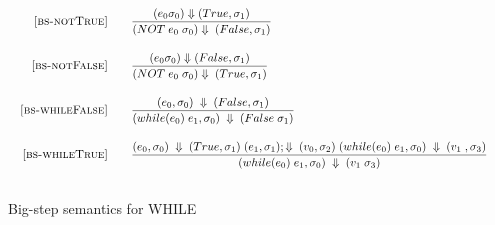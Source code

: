 \documentclass{article}
\begin{document}
\newpage
\begin{figure}[H]\label{fig:bigstep}
\caption{Big-step semantics for WHILE}

\[
\begin{array}{cc}
\begin{array}{r@{\qquad}l}
\bsrule{bs-notTrue}{
  ({e_0}{\sigma_0})\Downarrow(True,{\sigma_1})
}{
   ({NOT \;e_0 }\;{\sigma_0})\Downarrow \;(False, {\sigma_1})
}
\bsrule{bs-notFalse}{
  ({e_0}{\sigma_0})\Downarrow(False,{\sigma_1})
}{
   ({NOT \;e_0 }\;{\sigma_0})\Downarrow \;(True, {\sigma_1})
}

\bsrule{bs-whileFalse}{
 ({e_0},{\sigma_0})\; \Downarrow\;({False},{\sigma_1})
}{
   (while ({e_0})\;{e_1},{\sigma_0})\;\Downarrow\;({False}\;{\sigma_1})
}
\bsrule{bs-whileTrue}{
 ({e_0},{\sigma_0})\;\Downarrow\;({True},{\sigma_1})\; ({e_1},{\sigma_1});\Downarrow\;({v_0},{\sigma_2})\;(while ({e_0})\;{e_1},{\sigma_0})\;\Downarrow\;({v_1}\;,{\sigma_3})
}{
   (while ({e_0})\;{e_1},{\sigma_0})\;\Downarrow\;({v_1}\;{\sigma_3})
}

\end{array}
  &
\begin{array}{r@{\qquad}l}


\end{array}
\end{array}
\]

\end{figure}
\end{document}

